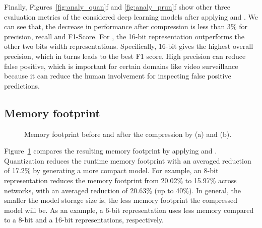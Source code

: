 Finally, Figures~\ref{fig:analy_quan}f and \ref{fig:analy_prun}f show other three evaluation metrics of the considered deep learning models
after applying \quantization and \pruning. We can see that, the decrease in performance after compression is  less than 3\% for precision,
recall and F1-Score. For \quantization, the 16-bit representation outperforms the other two bits width representations. Specifically,
16-bit gives the highest overall precision, which in turns leads to the best F1 score. High precision can reduce false positive, which is
important for certain domains like video surveillance because it can reduce the human involvement for inspecting false positive
predictions.




\subsection{Memory footprint}

\begin{figure}[!t]
\centering
{}
\hfill
{}
\hfill

\caption{Memory footprint before and after the compression by \quantization(a) and \pruning (b).}
\label{fig:footprint}
\end{figure}

Figure~\ref{fig:footprint} compares the resulting memory footprint by applying \quantization and \pruning. Quantization reduces the runtime
memory footprint with an averaged reduction of 17.2\% by generating a more compact model. For example, an 8-bit representation reduces the
memory footprint from 20.02\% to 15.97\% across networks, with an averaged reduction of 20.63\% (up to 40\%). In general, the smaller the
model storage size is, the less memory footprint the compressed model will be. As an example, a 6-bit representation uses  less memory compared to a 8-bit and a 16-bit representations, respectively.

